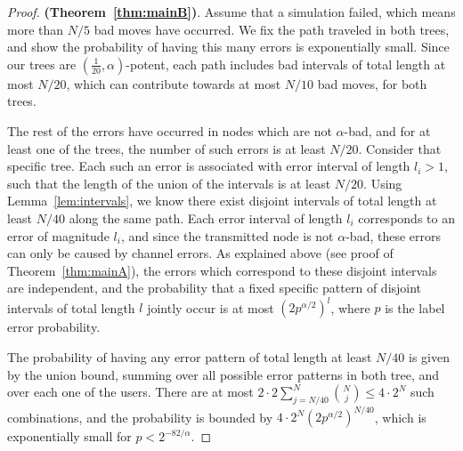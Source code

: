 \documentclass[ letterpaper, 11pt]{article}
\newcommand{\potent}{potent\xspace}
\begin{document}
\begin{proof}\textbf{(Theorem~\ref{thm:mainB})}.
Assume that a simulation failed, which means more than $N/5$ bad moves have occurred.
We fix the path traveled in both trees,
and show the probability of having this many errors is exponentially small.
Since our trees are $(\frac1{20},\alpha)$-\potent, each path includes bad intervals of total length
at most $N/20$, which can contribute
towards at most $N/10$ bad moves, for both trees.

The rest of the errors have occurred in nodes which are not $\alpha$-bad, and for at least
one of the trees, the number of such errors is at least $N/20$. Consider that specific tree.
Each such an error is associated with error interval of length $l_i>1$, such that
the length of the union of the intervals is at least $N/20$.
Using Lemma~\ref{lem:intervals}, we know there exist disjoint intervals of total length
at least $N/40$ along the same path.
Each error interval of length $l_i$ corresponds to an error of magnitude $l_i$, and
since the transmitted node is not $\alpha$-bad, these errors can only be caused by channel errors.
As explained above (see proof of Theorem~\ref{thm:mainA}),
the errors which correspond to these disjoint intervals are independent,
and the probability that a fixed specific pattern of disjoint intervals
of total length $l$ jointly occur
is at most $(2p^{\alpha/2})^{l}$, where $p$ is the label error probability.

The probability
of having any error pattern of total length at least $N/40$
is given by the union bound, summing over
all possible error patterns in both tree, and over each one of the users. There are
at most $2\cdot 2\sum_{j=N/40}^N{N \choose j}\le 4\cdot2^N$ such combinations, and
the probability is bounded by $4\cdot2^N(2p^{\alpha/2})^{N/40}$, which is exponentially small for
$p < 2^{-82/\alpha}$.
\end{proof}
\end{document}

